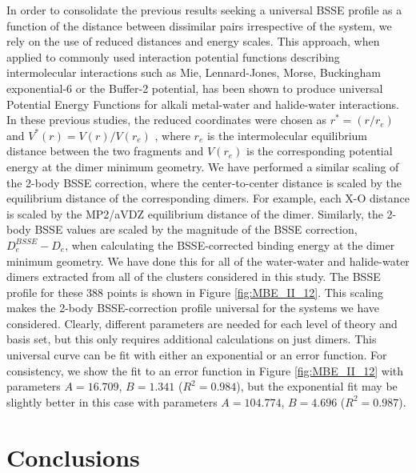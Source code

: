 \documentclass[11pt, proquest]{uwthesis}[2020/02/24]
\let\ce\ch
\begin{document}
\par In order to consolidate the previous results seeking a universal BSSE profile as a function of the distance between dissimilar pairs irrespective of the system, we rely on the use of reduced distances and energy scales. This approach, when applied to commonly used interaction potential functions describing intermolecular interactions such as Mie, Lennard-Jones, Morse, Buckingham exponential-6 or the Buffer-2 potential, has been shown to produce universal Potential Energy Functions for alkali metal-water and halide-water interactions.\autocite{werhahn_universal_2014,werhahn_new_2015,xantheas_universal_2014}  In these previous studies, the reduced coordinates were chosen as $r^*=(r/r_e)$ and $V^*(r)=V(r)/V(r_e)$ , where $r_e$ is the intermolecular equilibrium distance between the two fragments and $V(r_e)$ is the corresponding potential energy at the dimer minimum geometry. We have performed a similar scaling of the 2-body BSSE correction, where the center-to-center distance is scaled by the equilibrium distance of the corresponding dimers. For example, each X-O distance is scaled by the MP2/aVDZ equilibrium distance of the \ce{X^-(H2O)} dimer. Similarly, the 2-body BSSE values are scaled by the magnitude of the BSSE correction, $D_e^{BSSE}-D_e$, when calculating the BSSE-corrected binding energy at the dimer minimum geometry. We have done this for all of the water-water and halide-water dimers extracted from all of the clusters considered in this study. The BSSE profile for these 388 points is shown in Figure \ref{fig:MBE_II_12}. This scaling makes the 2-body BSSE-correction profile universal for the systems we have considered. Clearly, different parameters are needed for each level of theory and basis set, but this only requires additional calculations on just dimers. This universal curve can be fit with either an exponential or an error function. For consistency, we show the fit to an error function in Figure \ref{fig:MBE_II_12} with parameters $A = 16.709$, $B = 1.341$ ($R^2 = 0.984$), but the exponential fit may be slightly better in this case with parameters $A = 104.774$, $B = 4.696$ ($R^2 = 0.987$).

\section{Conclusions} \label{sec:MBE_2_sec_4}
\end{document}
